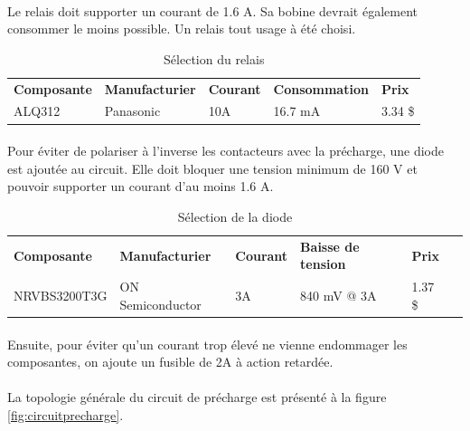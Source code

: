 		\paragraph*{}		
		Le relais doit supporter un courant de 1.6 A. Sa bobine devrait également consommer le moins possible. Un relais tout usage à été choisi.
		
		\begin{table}[H]
			\centering
			\caption{Sélection du relais}
			\label{RelaisPrecharge}
			\begin{tabular}{|p{3cm}|p{3cm}|p{3cm}|p{3cm}|p{3cm}|}
				\hline
				\textbf{Composante} & \textbf{Manufacturier} &  \textbf{Courant} & \textbf{Consommation} & \textbf{Prix}
				\\ \hhline{|=|=|=|=|=|}
				ALQ312 & Panasonic & 10A & 16.7 mA & 3.34 \$ \\ \hline		
			\end{tabular}
		\end{table}				
		
	
		\paragraph*{}	
		Pour éviter de polariser à l'inverse les contacteurs avec la précharge, une diode est ajoutée au circuit. Elle doit bloquer une tension minimum de 160 V et pouvoir supporter un courant d'au moins 1.6 A. 
		
		\begin{table}[H]
			\centering
			\caption{Sélection de la diode}
			\label{DiodePrecharge}
			\begin{tabular}{|p{3cm}|p{3cm}|p{3cm}|p{3cm}|p{3cm}|p{3cm}|}
				\hline
				\textbf{Composante} & \textbf{Manufacturier} & \textbf{Courant} &  \textbf{Baisse de tension} & \textbf{Prix}
				\\ \hhline{|=|=|=|=|=|=|}
				NRVBS3200T3G & ON Semiconductor & 3A & 840 mV @ 3A & 1.37 \$ \\ \hline		
			\end{tabular}
		\end{table}				
		
		\paragraph*{}			
		Ensuite, pour éviter qu'un courant trop élevé ne vienne endommager les composantes, on ajoute un fusible de 2A à action retardée. 
		
		\paragraph*{}			
		La topologie générale du circuit de précharge est présenté à la figure \ref{fig:circuitprecharge}.
				
